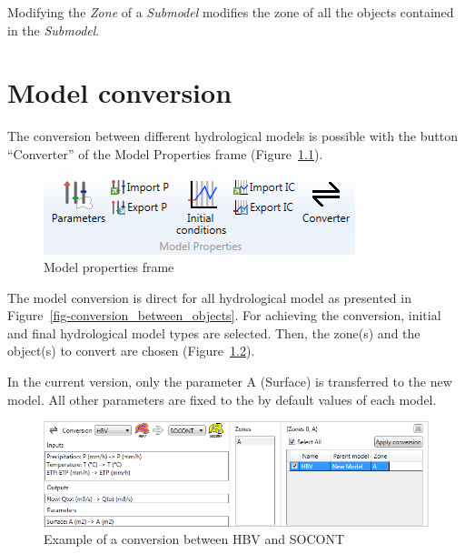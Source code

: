 \documentclass[
  letterpaper,
  DIV=11,
  numbers=noendperiod]{scrreprt}
\begin{document}
Modifying the \emph{Zone} of a \emph{Submodel} modifies the zone of all
the objects contained in the \emph{Submodel}.

\hypertarget{sec-user_rainfall_runoff_model_conversion}{%
\chapter{Model
conversion}\label{sec-user_rainfall_runoff_model_conversion}}

The conversion between different hydrological models is possible with
the button ``Converter'' of the Model Properties frame
(Figure~\ref{fig-model_properties_frame}).

\begin{figure}

{\centering \includegraphics{./figures/fig-model_properties_frame.png}

}

\caption{\label{fig-model_properties_frame}Model properties frame}

\end{figure}

The model conversion is direct for all hydrological model as presented
in Figure~\ref{fig-conversion_between_objects}. For achieving the
conversion, initial and final hydrological model types are selected.
Then, the zone(s) and the object(s) to convert are chosen
(Figure~\ref{fig-example_conversion_hbv_socont}).

In the current version, only the parameter A (Surface) is transferred to
the new model. All other parameters are fixed to the by default values
of each model.

\begin{figure}

{\centering \includegraphics{./figures/fig-example_conversion_hbv_socont.png}

}

\caption{\label{fig-example_conversion_hbv_socont}Example of a
conversion between HBV and SOCONT}

\end{figure}
\end{document}

